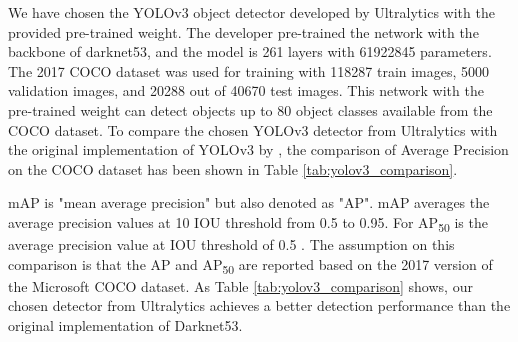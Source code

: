 We have chosen the YOLOv3 object detector developed by Ultralytics \cite{jocher_ultralyticsyolov3_2021} with the provided pre-trained weight. The developer \citeauthor{jocher_ultralyticsyolov3_2021} pre-trained the network with the backbone of darknet53, and the model is 261 layers with 61922845 parameters. The 2017 COCO dataset was used for training with 118287 train images, 5000 validation images, and 20288 out of 40670 test images. This network with the pre-trained weight can detect objects up to 80 object classes available from the COCO dataset. To compare the chosen YOLOv3 detector from Ultralytics with the original implementation of YOLOv3 by \citeauthor{redmon_yolov3_2018}, the comparison of Average Precision on the COCO dataset has been shown in Table \ref{tab:yolov3_comparison}.

mAP is "mean average precision" but also denoted as "AP". mAP averages the average precision values at 10 IOU threshold from 0.5 to 0.95. For AP\textsubscript{50} is the average precision value at IOU threshold of 0.5 \cite{noauthor_coco_nodate}. The assumption on this comparison is that the AP and AP\textsubscript{50} are reported based on the 2017 version of the Microsoft COCO dataset. As Table \ref{tab:yolov3_comparison} shows, our chosen detector from Ultralytics achieves a better detection performance than the original implementation of Darknet53.